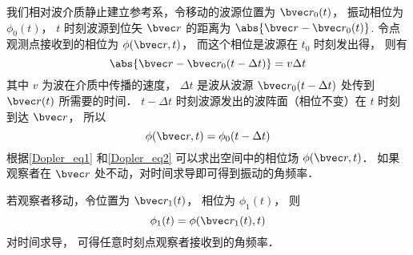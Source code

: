 

我们相对波介质静止建立参考系，令移动的波源位置为 $\bvec r_0(t)$， 振动相位为 $\phi_0(t)$， $t$ 时刻波源到位矢 $\bvec r$ 的距离为 $\abs{\bvec r - \bvec r_0(t)}$. 令点观测点接收到的相位为 $\phi(\bvec r, t)$， 而这个相位是波源在 $t_0$ 时刻发出得， 则有
\begin{equation}\label{Dopler_eq1}
\abs{\bvec r - \bvec r_0(t-\Delta t)} = v\Delta t
\end{equation}
其中 $v$ 为波在介质中传播的速度， $\Delta t$ 是波从波源 $\bvec r_0(t - \Delta t)$ 处传到 $\bvec r(t)$ 所需要的时间． $t - \Delta t$ 时刻波源发出的波阵面（相位不变）在 $t$ 时刻到达 $\bvec r$， 所以
\begin{equation}\label{Dopler_eq2}
\phi(\bvec r, t) = \phi_0(t - \Delta t)
\end{equation}
根据\autoref{Dopler_eq1} 和\autoref{Dopler_eq2} 可以求出空间中的相位场 $\phi(\bvec r, t)$． 如果观察者在 $\bvec r$ 处不动，对时间求导即可得到振动的角频率．

若观察者移动，令位置为 $\bvec r_1(t)$， 相位为 $\phi_1(t)$， 则
\begin{equation}\label{Dopler_eq3}
\phi_1(t) = \phi(\bvec r_1(t), t)
\end{equation}
对时间求导， 可得任意时刻点观察者接收到的角频率．


